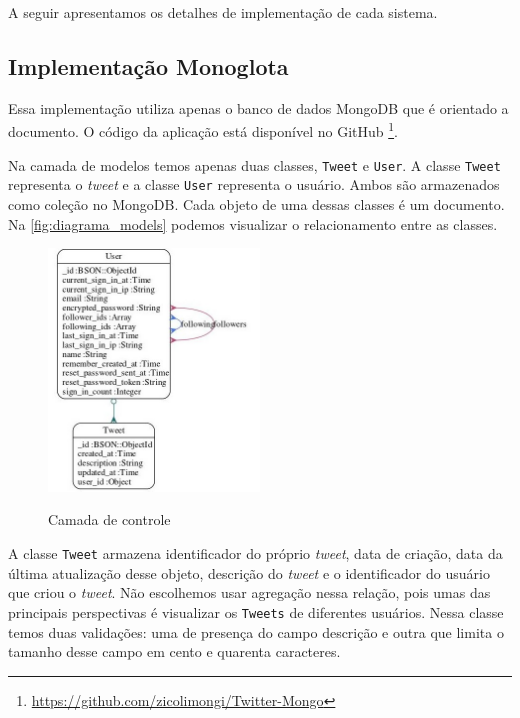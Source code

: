 A seguir apresentamos os detalhes de implementação de cada sistema.

\subsection{Implementação Monoglota}
\label{subsec:monoglot}

Essa implementação utiliza apenas o banco de dados MongoDB que é orientado a documento. O código da aplicação está disponível no GitHub \footnote{\url{https://github.com/zicolimongi/Twitter-Mongo}}.

Na camada de modelos temos apenas duas classes, \verb|Tweet| e \verb|User|. A classe \verb|Tweet| representa o \textit{tweet} e a classe \verb|User| representa o usuário. Ambos são armazenados como coleção no MongoDB. Cada objeto de uma dessas classes é um documento. Na \autoref{fig:diagrama_models} podemos visualizar o relacionamento entre as classes.
\begin{figure}[H]
    \centering
    \caption{Camada de controle}
    \includegraphics[width=0.5\textwidth]{./04-figuras/models_complete.jpg}
    \label{fig:diagrama_models}
\end{figure}
A classe \verb|Tweet| armazena identificador do próprio \textit{tweet}, data de criação, data da última atualização desse objeto, descrição do \textit{tweet} e o identificador do usuário que criou o \textit{tweet}. Não escolhemos usar agregação nessa relação, pois umas das principais perspectivas é visualizar os \verb|Tweets| de diferentes usuários. Nessa classe temos duas validações: uma de presença do campo descrição e outra que limita o tamanho desse campo em cento e quarenta caracteres.

